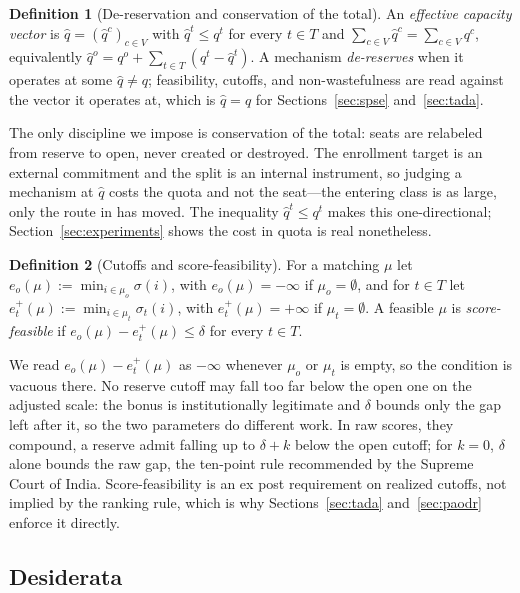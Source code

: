 \documentclass[a4paper,twoside]{article}
\theoremstyle{definition}
\newtheorem{definition}{Definition}
\begin{document}
\begin{definition}[De-reservation and conservation of the total]
\label{def:dereserve}
An \emph{effective capacity vector} is $\hat q=(\hat q^c)_{c\in V}$ with $\hat q^t\le q^t$ for every $t\in T$ and $\sum_{c\in V}\hat q^c=\sum_{c\in V}q^c$, equivalently $\hat q^o=q^o+\sum_{t\in T}(q^t-\hat q^t)$. A mechanism \emph{de-reserves} when it operates at some $\hat q\neq q$; feasibility, cutoffs, and non-wastefulness are read against the vector it operates at, which is $\hat q=q$ for Sections~\ref{sec:spse} and~\ref{sec:tada}.
\end{definition}

The only discipline we impose is conservation of the total: seats are relabeled from reserve to open, never created or destroyed. The enrollment target is an external commitment and the split is an internal instrument, so judging a mechanism at $\hat q$ costs the quota and not the seat---the entering class is as large, only the route in has moved. The inequality $\hat q^t\le q^t$ makes this one-directional; Section~\ref{sec:experiments} shows the cost in quota is real nonetheless.

\begin{definition}[Cutoffs and score-feasibility]
\label{def:scorefeas}
For a matching $\mu$ let $e_o(\mu):=\min_{i\in\mu_o}\sigma(i)$, with $e_o(\mu)=-\infty$ if $\mu_o=\emptyset$, and for $t\in T$ let $e_t^+(\mu):=\min_{i\in\mu_t}\sigma_t(i)$, with $e_t^+(\mu)=+\infty$ if $\mu_t=\emptyset$. A feasible $\mu$ is \emph{score-feasible} if $e_o(\mu)-e_t^+(\mu)\le\delta$ for every $t\in T$.
\end{definition}

We read $e_o(\mu)-e_t^+(\mu)$ as $-\infty$ whenever $\mu_o$ or $\mu_t$ is empty, so the condition is vacuous there. No reserve cutoff may fall too far below the open one on the adjusted scale: the bonus is institutionally legitimate and $\delta$ bounds only the gap left after it, so the two parameters do different work. In raw scores, they compound, a reserve admit falling up to $\delta+k$ below the open cutoff; for $k=0$, $\delta$ alone bounds the raw gap, the ten-point rule recommended by the Supreme Court of India. Score-feasibility is an ex post requirement on realized cutoffs, not implied by the ranking rule, which is why Sections~\ref{sec:tada} and~\ref{sec:paodr} enforce it directly.

\subsection{Desiderata}
\end{document}
